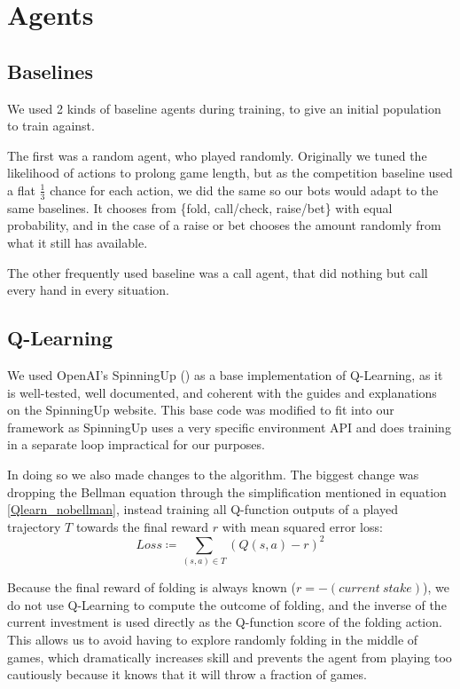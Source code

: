 \section{Agents}

\subsection{Baselines}
We used 2 kinds of baseline agents during training, to give an initial population to train against.

The first was a random agent, who played randomly. Originally we tuned the likelihood of actions to prolong game length, but as the competition baseline used a flat $\frac{1}{3}$ chance for each action, we did the same so our bots would adapt to the same baselines. It chooses from \{fold, call/check, raise/bet\} with equal probability, and in the case of a raise or bet chooses the amount randomly from what it still has available.

The other frequently used baseline was a call agent, that did nothing but call every hand in every situation.

\subsection{Q-Learning}
We used OpenAI's SpinningUp (\cite{SpinningUp2018}) as a base implementation of Q-Learning, as it is well-tested, well documented, and coherent with the guides and explanations on the SpinningUp website. This base code was modified to fit into our framework as SpinningUp uses a very specific environment API and does training in a separate loop impractical for our purposes.

In doing so we also made changes to the algorithm. The biggest change was dropping the Bellman equation through the simplification mentioned in equation \ref{Qlearn_nobellman}, instead training all Q-function outputs of a played trajectory $T$ towards the final reward $r$ with mean squared error loss:
\begin{equation}
    Loss \coloneqq \sum_{(s, a) \in T} (Q(s, a) - r)^2
\end{equation}

Because the final reward of folding is always known ($r = -(current\ stake)$), we do not use Q-Learning to compute the outcome of folding, and the inverse of the current investment is used directly as the Q-function score of the folding action. This allows us to avoid having to explore randomly folding in the middle of games, which dramatically increases skill and prevents the agent from playing too cautiously because it knows that it will throw a fraction of games.

